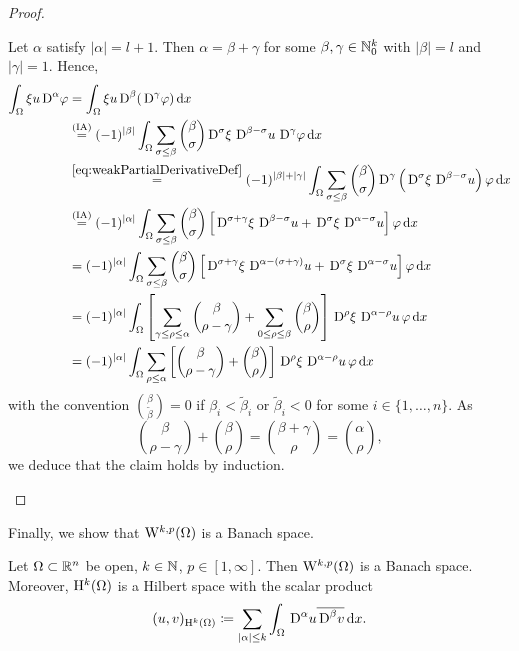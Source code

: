 \begin{proof}
\begin{enumerate}
      Let $\alpha$ satisfy $|\alpha| = l+1$.
      Then $\alpha  = \beta + \gamma$ for some $\beta, \gamma \in \mathbb{N}_0^k$ with $|\beta| = l$ and $|\gamma| = 1$.
      Hence,
      \begin{align*}
        \int_\Omega \xi u \,{\operatorname{D}}^\alpha \varphi
        &= \int_\Omega \xi u\,{\operatorname{D}}^\beta (\,{\operatorname{D}}^\gamma \varphi ) \, {\operatorname{d}\!{x}} \\
        &\overset{\mathrm{(IA)}}{=} (-1)^{|\beta|} \int_\Omega \sum_{\sigma \leq \beta} \binom{\beta}{\sigma} \,{\operatorname{D}}^\sigma \xi\, \,{\operatorname{D}}^{\beta - \sigma} u\, \,{\operatorname{D}}^\gamma \varphi \, {\operatorname{d}\!{x}} \\
        &\overset{\eqref{eq:weakPartialDerivativeDef}}{=} (-1)^{|\beta|+|\gamma|} \int_\Omega \sum_{\sigma \leq \beta} \binom{\beta}{\sigma} \,{\operatorname{D}}^\gamma \left( \,{\operatorname{D}}^\sigma \xi \, \,{\operatorname{D}}^{\beta - \sigma} u \right) \varphi \, {\operatorname{d}\!{x}} \\
        &\overset{\mathrm{(IA)}}{=} (-1)^{|\alpha|} \int_\Omega \sum_{\sigma \leq \beta} \binom{\beta}{\sigma} \left[ \,{\operatorname{D}}^{\sigma + \gamma} \xi\, \,{\operatorname{D}}^{\beta - \sigma} u + \,{\operatorname{D}}^\sigma \xi \,\,{\operatorname{D}}^{\alpha - \sigma} u \right] \varphi \, {\operatorname{d}\!{x}}\\
        &= (-1)^{|\alpha|} \int_\Omega \sum_{\sigma \leq \beta} \binom{\beta}{\sigma} \left[ \,{\operatorname{D}}^{\sigma + \gamma} \xi\, \,{\operatorname{D}}^{\alpha - (\sigma + \gamma)} u + \,{\operatorname{D}}^\sigma \xi \,\,{\operatorname{D}}^{\alpha - \sigma} u \right] \varphi \, {\operatorname{d}\!{x}}\\
        &= (-1)^{|\alpha|} \int_\Omega \left [\sum_{\gamma \leq \rho \leq \alpha} \binom{\beta}{\rho - \gamma} + \sum_{0 \leq \rho \leq \beta} \binom{\beta}{\rho} \right] \,{\operatorname{D}}^\rho \xi \,\,{\operatorname{D}}^{\alpha - \rho}u \, \varphi \, {\operatorname{d}\!{x}} \\
        &= (-1)^{|\alpha|} \int_\Omega \sum_{\rho \leq \alpha} \left[ \binom{\beta}{\rho - \gamma} + \binom{\beta }{\rho}\right] \,{\operatorname{D}}^\rho \xi \, \,{\operatorname{D}}^{\alpha - \rho} u \, \varphi \, {\operatorname{d}\!{x}}
      \end{align*}
      with the convention $\binom{\beta}{\tilde\beta} = 0$ if $\beta_i < \tilde \beta_i$ or $\tilde \beta_i < 0$ for some $i \in \{1,\dots,n\}$.
      As $$\binom{\beta}{\rho - \gamma} + \binom{\beta}{\rho} = \binom{\beta + \gamma}{\rho} = \binom{\alpha}{\rho},$$ we deduce that the claim holds by induction.\qedhere
  \end{enumerate}
\end{proof}

Finally, we show that $\mathrm{W}^{k,p}(\Omega)$ is a Banach space.

\begin{thm}
  Let $\Omega \subset \mathbb{R}^n$ be open, $k \in \mathbb{N}$, $p \in [1,\infty]$.
  Then $\mathrm{W}^{k,p}(\Omega)$ is a Banach space.
  Moreover, $\mathrm{H}^k(\Omega)$ is a Hilbert space with the scalar product
  $$
  (u,v)_{\mathrm{H}^k(\Omega)} \coloneqq \sum_{|\alpha| \leq k} \int_\Omega \,{\operatorname{D}}^\alpha u \overline{\,{\operatorname{D}}^\beta v} \, {\operatorname{d}\!{x}}.
  $$
\end{thm}

